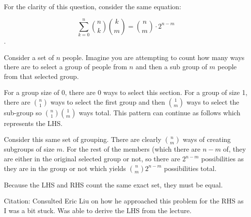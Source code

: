 \documentclass[12pt]{exam}
\begin{document}
\begin{enumerate}
For the clarity of this question, consider the same equation:

$$\sum_{k=0}^{n}\binom{n}{k}\binom{k}{m} = \binom{n}{m} \cdot 2^{n - m}$$.

Consider a set of $n$ people. Imagine you are attempting to count how many ways there are to select a group of people from $n$ and then a sub group of $m$ people from that selected group. 

For a group size of 0, there are 0 ways to select this section. For a group of size 1, there are $\binom{n}{1}$ ways to select the first group and then $\binom{1}{m}$ ways to select the sub-group so $\binom{n}{1}\binom{1}{m}$ ways total. This pattern can continue as follows which represents the LHS. 

Consider this same set of grouping. There are clearly $\binom{n}{m}$ ways of creating subgroups of size $m$. For the rest of the members (which there are $n - m$ of, they are either in the original selected group or not, so there are $2^{n - m}$ possibilities as they are in the group or not which yields $\binom{n}{m}2^{n - m}$ possibilities total. 

Because the LHS and RHS count the same exact set, they must be equal. 


Citation: Consulted Eric Liu on how he approached this problem for the RHS as I was a bit stuck. Was able to derive the LHS from the lecture. 

\end{enumerate}
\end{document}
